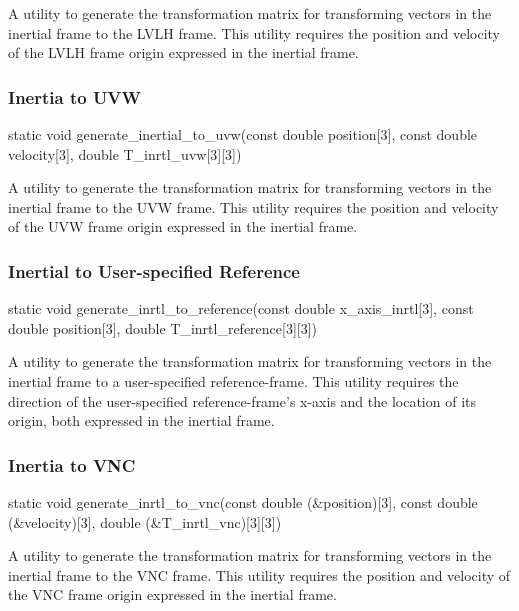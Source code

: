 \documentclass[11pt,fleqn]{report}
\begin{document}
A utility to generate the transformation matrix for transforming vectors in the
inertial frame to the LVLH frame. This utility requires the position and
velocity of the LVLH frame origin expressed in the inertial frame.

\subsubsection{Inertia to UVW}
\begin{code}
static void generate_inertial_to_uvw(const double position[3],
                                     const double velocity[3],
                                     double T_inrtl_uvw[3][3])
\end{code}

A utility to generate the transformation matrix for transforming vectors in the
inertial frame to the UVW frame. This utility requires the position and
velocity of the UVW frame origin expressed in the inertial frame.

\subsubsection{Inertial to User-specified Reference}
\begin{code}
static void generate_inrtl_to_reference(const double x_axis_inrtl[3],
                                        const double position[3],
                                        double T_inrtl_reference[3][3])
\end{code}

A utility to generate the transformation matrix for transforming vectors in the
inertial frame to a user-specified reference-frame. This utility requires the
direction of the user-specified reference-frame's x-axis and the location of
its origin, both expressed in the inertial frame.

\subsubsection{Inertia to VNC}
\begin{code}
static void generate_inrtl_to_vnc(const double (&position)[3],
                                  const double (&velocity)[3],
                                  double (&T_inrtl_vnc)[3][3])
\end{code}

A utility to generate the transformation matrix for transforming vectors in the
inertial frame to the VNC frame. This utility requires the position and
velocity of the VNC frame origin expressed in the inertial frame.
\end{document}
